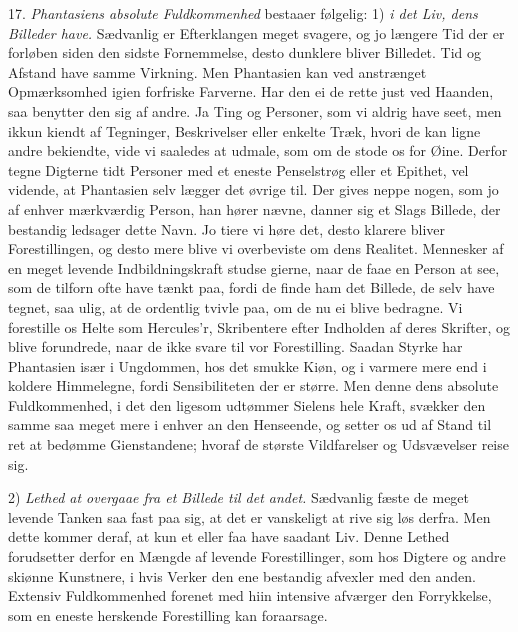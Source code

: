 \documentclass[12pt,a4paper]{article}
\newcommand{\opage}[1]{\marginnote{\footnotesize\textit{[#1]}}}
\begin{document}
17. \emph{Phantasiens absolute Fuldkommenhed} bestaaer følgelig: 1) \emph{i det Liv,
dens Billeder have.} Sædvanlig er Efterklangen meget svagere, og jo længere Tid der er
forløben siden den sidste Fornemmelse, desto dunklere bliver Billedet. Tid og
\opage{123} Afstand have samme Virkning. Men Phantasien kan ved anstrænget Opmærksomhed igien
forfriske Farverne. Har den ei de rette just ved Haanden, saa benytter den sig af andre.
Ja Ting og Personer, som vi aldrig have seet, men ikkun kiendt af Tegninger, Beskrivelser
eller enkelte Træk, hvori de kan ligne andre bekiendte, vide vi saaledes at udmale, som
om de stode os for Øine. Derfor tegne Digterne tidt Personer med et eneste Penselstrøg
eller et Epithet, vel vidende, at Phantasien selv lægger det øvrige til. Der gives neppe
nogen, som jo af enhver mærkværdig Person, han hører nævne, danner sig et Slags Billede,
der bestandig ledsager dette Navn. Jo tiere vi høre det, desto klarere bliver
Forestillingen, og desto mere blive vi overbeviste om dens Realitet. Mennesker af en
meget levende Indbildningskraft studse gierne, naar de faae en Person at see, som de
tilforn ofte have tænkt paa, fordi de finde ham det Billede, de selv have tegnet, saa
ulig, at de ordentlig tvivle paa, om de nu ei blive bedragne. Vi forestille os Helte som
Hercules'r, Skribentere efter Indholden af deres Skrifter, og blive forundrede, naar de
ikke svare til vor Forestilling. Saadan Styrke har Phantasien især i Ungdommen, hos det
smukke Kiøn, og i varmere mere end i koldere Himmelegne, fordi Sensibiliteten der er
større. Men denne dens absolute Fuldkommenhed, i det den ligesom udtømmer Sielens hele
Kraft, svækker den samme saa meget mere i enhver an%
\opage{124}den Henseende, og setter os ud af Stand til ret at bedømme Gienstandene; hvoraf de
største Vildfarelser og Udsvævelser reise sig.

2) \emph{Lethed at overgaae fra et Billede til det andet.} Sædvanlig fæste de meget
levende Tanken saa fast paa sig, at det er vanskeligt at rive sig løs derfra. Men dette
kommer deraf, at kun et eller faa have saadant Liv. Denne Lethed forudsetter derfor en
Mængde af levende Forestillinger, som hos Digtere og andre skiønne Kunstnere, i hvis
Verker den ene bestandig afvexler med den anden. Extensiv Fuldkommenhed forenet med hiin
intensive afværger den Forrykkelse, som en eneste herskende Forestilling kan foraarsage.
\end{document}
